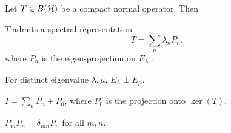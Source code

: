 \begin{theorem}
    Let $T\in B(\mathcal{H})$ be a compact normal operator. Then 
    \begin{thmenum}
        \item $T$ admits a spectral representation 
        \begin{equation*}
            T = \sum_n \lambda_n P_n,
        \end{equation*}
        where $P_n$ is the eigen-projection on $E_{\lambda_n}$. 
        \item For distinct eigenvalue $\lambda,\mu$, $E_\lambda\perp E_\mu$. 
        \item $I = \sum_n P_n + P_0$, where $P_0$ is the projection onto $\ker(T)$. 
        \item $P_mP_n = \delta_{mn}P_n$ for all $m,n$.
    \end{thmenum}
\end{theorem}

